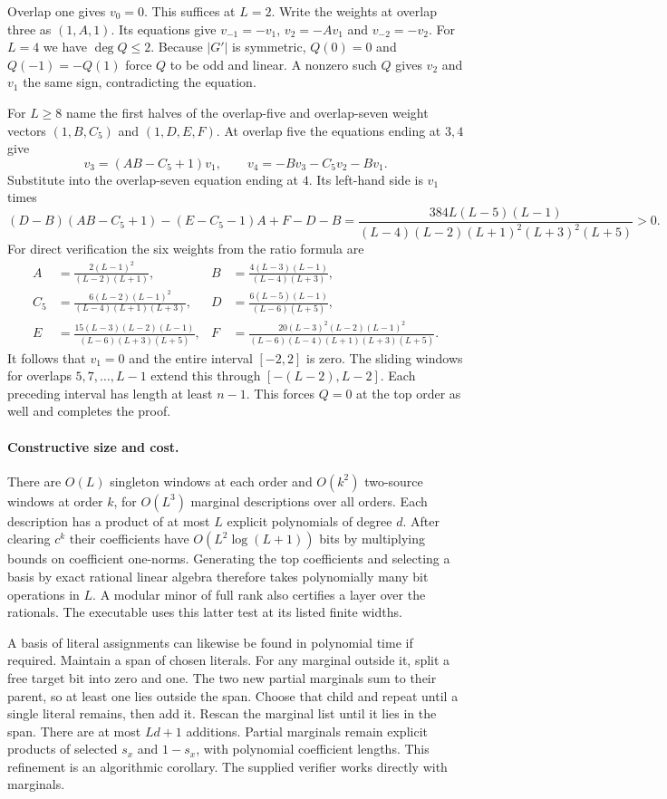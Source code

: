 \documentclass[11pt]{article}
\begin{document}
Overlap one gives $v_0=0$. This suffices at $L=2$. Write the weights
at overlap three as $(1,A,1)$. Its equations give $v_{-1}=-v_1$,
$v_2=-Av_1$ and $v_{-2}=-v_2$. For $L=4$ we have $\deg Q\le2$.
Because $|G'|$ is symmetric, $Q(0)=0$ and $Q(-1)=-Q(1)$ force $Q$
to be odd and linear. A nonzero such $Q$ gives $v_2$ and $v_1$ the
same sign, contradicting the equation.

For $L\ge8$ name the first halves of the overlap-five and overlap-seven
weight vectors $(1,B,C_5)$ and $(1,D,E,F)$. At overlap five the equations
ending at $3,4$ give
\[
 v_3=(AB-C_5+1)v_1,\qquad v_4=-Bv_3-C_5v_2-Bv_1 .
\]
Substitute into the overlap-seven equation ending at $4$. Its left-hand
side is $v_1$ times
\[
 (D-B)(AB-C_5+1)-(E-C_5-1)A+F-D-B
 =\frac{384L(L-5)(L-1)}{(L-4)(L-2)(L+1)^2(L+3)^2(L+5)}>0 .
\]
For direct verification the six weights from the ratio formula are
\begin{align*}
 A&=\frac{2(L-1)^2}{(L-2)(L+1)},&
 B&=\frac{4(L-3)(L-1)}{(L-4)(L+3)},\\
 C_5&=\frac{6(L-2)(L-1)^2}{(L-4)(L+1)(L+3)},&
 D&=\frac{6(L-5)(L-1)}{(L-6)(L+5)},\\
 E&=\frac{15(L-3)(L-2)(L-1)}{(L-6)(L+3)(L+5)},&
 F&=\frac{20(L-3)^2(L-2)(L-1)^2}{(L-6)(L-4)(L+1)(L+3)(L+5)} .
\end{align*}
It follows that $v_1=0$ and the entire interval $[-2,2]$ is zero.
The sliding windows for overlaps $5,7,\ldots,L-1$ extend this through
$[-(L-2),L-2]$. Each preceding interval has length at least $n-1$.
This forces $Q=0$ at the top order as well and completes the proof.

\paragraph{Constructive size and cost.}
There are $O(L)$ singleton windows at each order and $O(k^2)$ two-source
windows at order $k$, for $O(L^3)$ marginal descriptions over all orders.
Each description has a product of at most $L$ explicit polynomials of
degree $d$. After clearing $c^k$ their coefficients have
$O(L^2\log(L+1))$ bits by multiplying bounds on coefficient one-norms.
Generating the top coefficients and selecting a basis by exact rational
linear algebra therefore takes polynomially many bit operations in $L$.
A modular minor of full rank also certifies a layer over the rationals.
The executable uses this latter test at its listed finite widths.

A basis of literal assignments can likewise be found in polynomial time
if required. Maintain a span of chosen literals. For any marginal outside
it, split a free target bit into zero and one. The two new partial marginals
sum to their parent, so at least one lies outside the span. Choose that
child and repeat until a single literal remains, then add it. Rescan the
marginal list until it lies in the span. There are at most $Ld+1$
additions. Partial marginals remain explicit products of selected $s_x$
and $1-s_x$, with polynomial coefficient lengths. This refinement is an
algorithmic corollary. The supplied verifier works directly with marginals.
\end{document}
